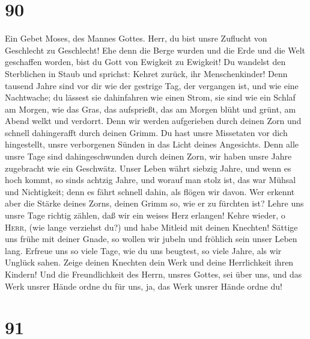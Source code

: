 \hypertarget{section-89}{%
\section{90}\label{section-89}}

 Ein Gebet Moses, des Mannes Gottes. Herr, du bist unsre
Zuflucht von Geschlecht zu Geschlecht!  Ehe denn die Berge
wurden und die Erde und die Welt geschaffen worden, bist du Gott von
Ewigkeit zu Ewigkeit!  Du wandelst den Sterblichen in
Staub und sprichst: Kehret zurück, ihr Menschenkinder! 
Denn tausend Jahre sind vor dir wie der gestrige Tag, der vergangen ist,
und wie eine Nachtwache;  du lässest sie dahinfahren wie
einen Strom, sie sind wie ein Schlaf am Morgen, wie das Gras, das
aufsprießt,  das am Morgen blüht und grünt, am Abend welkt
und verdorrt.  Denn wir werden aufgerieben durch deinen
Zorn und schnell dahingerafft durch deinen Grimm.  Du hast
unsre Missetaten vor dich hingestellt, unsre verborgenen Sünden in das
Licht deines Angesichts.  Denn alle unsre Tage sind
dahingeschwunden durch deinen Zorn, wir haben unsre Jahre zugebracht wie
ein Geschwätz.  Unser Leben währt siebzig Jahre, und wenn
es hoch kommt, so sind\textquotesingle s achtzig Jahre, und worauf man
stolz ist, das war Mühsal und Nichtigkeit; denn es fährt schnell dahin,
als flögen wir davon.  Wer erkennt aber die Stärke deines
Zorns, deinen Grimm so, wie er zu fürchten ist?  Lehre
uns unsre Tage richtig zählen, daß wir ein weises Herz erlangen!
 Kehre wieder, o \textsc{Herr}, (wie lange verziehst du?)
und habe Mitleid mit deinen Knechten!  Sättige uns frühe
mit deiner Gnade, so wollen wir jubeln und fröhlich sein unser Leben
lang.  Erfreue uns so viele Tage, wie du uns beugtest, so
viele Jahre, als wir Unglück sahen.  Zeige deinen
Knechten dein Werk und deine Herrlichkeit ihren Kindern! 
Und die Freundlichkeit des Herrn, unsres Gottes, sei über uns, und das
Werk unsrer Hände ordne du für uns, ja, das Werk unsrer Hände ordne du!

\hypertarget{section-90}{%
\section{91}\label{section-90}}

